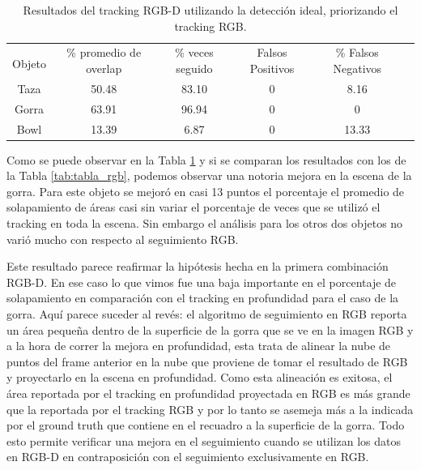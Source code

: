 \begin{table}[h]
	\centering
    \begin{tabular}{|c|c|c|c|c|c|}
    \hline
    & \multirow{2}{2.4cm}{\% promedio de overlap} & \multirow{2}{2cm}{\% veces seguido} & \multirow{2}{1.6cm}{Falsos Positivos} & \multirow{2}{1.6cm}{\% Falsos Negativos}\\
	Objeto & & & &\\
    \hline
    Taza   & 50.48      & 83.10     & 0      & 8.16  \\
    \hline
    Gorra  & 63.91      & 96.94     & 0      & 0     \\
    \hline
    Bowl   & 13.39      &  6.87     & 0      & 13.33 \\
    \hline
    \end{tabular}
\caption{Resultados del tracking RGB-D utilizando la detección ideal, priorizando el tracking RGB.}
\label{tabla_rgbd_rgb}
\end{table}


Como se puede observar en la Tabla \ref{tabla_rgbd_rgb} y si se comparan los resultados con los de la Tabla \ref{tab:tabla_rgb}, podemos observar una notoria mejora en la escena de la gorra. Para este objeto se mejoró en casi 13 puntos el porcentaje el promedio de solapamiento de áreas casi sin variar el porcentaje de veces que se utilizó el tracking en toda la escena. Sin embargo el análisis para los otros dos objetos no varió mucho con respecto al seguimiento RGB.

Este resultado parece reafirmar la hipótesis hecha en la primera combinación RGB-D. En ese caso lo que vimos fue una baja importante en el porcentaje de solapamiento en comparación con el tracking en profundidad para el caso de la gorra. Aquí parece suceder al revés: el algoritmo de seguimiento en RGB reporta un área pequeña dentro de la superficie de la gorra que se ve en la imagen RGB y a la hora de correr la mejora en profundidad, esta trata de alinear la nube de puntos del frame anterior en la nube que proviene de tomar el resultado de RGB y proyectarlo en la escena en profundidad. Como esta alineación es exitosa, el área reportada por el tracking en profundidad proyectada en RGB es más grande que la reportada por el tracking RGB y por lo tanto se asemeja más a la indicada por el ground truth que contiene en el recuadro a la superficie de la gorra. Todo esto permite verificar una mejora en el seguimiento cuando se utilizan los datos en RGB-D en contraposición con el seguimiento exclusivamente en RGB.




